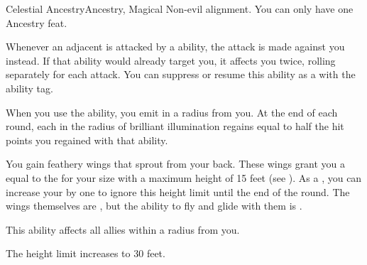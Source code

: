  \begin{magicalfeat}{Celestial Ancestry}{Ancestry, Magical}
    \featpre Non-evil alignment.
     You can only have one Ancestry feat.

     Whenever an adjacent  is attacked by a  ability, the attack is made against you instead.
    If that ability would already target you, it affects you twice, rolling separately for each attack.
    You can suppress or resume this ability as a  with the  ability tag.

     When you use the  ability, you  emit  in a \largearea radius  from you.
    At the end of each round, each  in the radius of brilliant illumination regains  equal to half the hit points you regained with that  ability.

     You gain feathery wings that sprout from your back.
    These wings grant you a  equal to the  for your size with a maximum height of 15 feet (see ).
    As a , you can increase your  by one to ignore this height limit until the end of the round.
    The wings themselves are , but the ability to fly and glide with them is \magical.

     This ability affects all allies within a \medarea radius  from you.

     The height limit increases to 30 feet.
  \end{magicalfeat}

